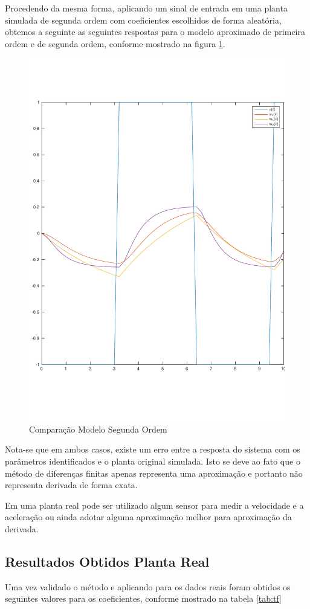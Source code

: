 \documentclass[a4paper,11pt]{article}
\begin{document}
Procedendo da mesma forma, aplicando um sinal de entrada em uma planta simulada de segunda ordem com coeficientes escolhidos de forma aleatória, obtemos a seguinte as seguintes respostas para o modelo aproximado de primeira ordem e de segunda ordem, conforme mostrado na figura \ref{fig:model2Evaluation}.

\begin{figure}[H]
    \centering
    \includegraphics[width=0.6\linewidth]{tex/img/model2Evaluation.pdf}
    \caption{Comparação Modelo Segunda Ordem}
    \label{fig:model2Evaluation}
\end{figure}

Nota-se que em ambos casos, existe um erro entre a resposta do sistema com os parâmetros identificados e o planta original simulada. Isto se deve ao fato que o método de diferenças finitas apenas representa uma aproximação e portanto não representa derivada de forma exata.

Em uma planta real pode ser utilizado algum sensor para medir a velocidade e a aceleração ou ainda adotar alguma aproximação melhor para aproximação da derivada.



\subsection{Resultados Obtidos Planta Real}

Uma vez validado o método e aplicando para os dados reais foram obtidos os seguintes valores para os coeficientes, conforme mostrado na tabela \ref{tab:tf}
\end{document}
